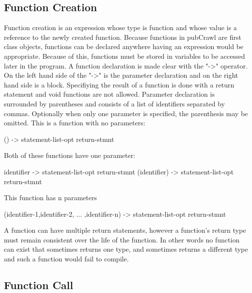 \documentclass[oneside]{book}
\begin{document}
\subsection{Function Creation}
Function creation is an expression whose type is function and whose value is a reference to the newly created function. Because functions in pubCrawl are first class objects, functions can be declared anywhere having an expression would be appropriate. Because of this, functions must be stored in variables to be accessed later in the program. A function declaration is made clear with the "-\textgreater" operator. On the left hand side of the "-\textgreater" is the parameter declaration and on the right hand side is a block. Specifiying the result of a function is done with a return statement and void functions are not allowed. Parameter declaration is surrounded by parentheses and consists of a list of identifiers separated by commas. Optionally when only one parameter is specified, the parenthesis may be omitted. 
This is a function with no parameters:
\begin{code}
() -> {
  statement-list-opt
  return-stmnt
}
\end{code}
Both of these functions have one parameter:
\begin{code}
identifier -> {
  statement-list-opt
  return-stmnt
}
(identifier) -> {
  statement-list-opt
  return-stmnt
}
\end{code}
This function has n parameters
\begin{code}
(identifier-1,identifier-2, ... ,identifier-n) -> {
  statement-list-opt
  return-stmnt
}
\end{code}
A function can have multiple return statements, however a function's return type must remain consistent over the life of the function. In other words no function can exist that sometimes returns one type, and sometimes returns a different type and such a function would fail to compile.

\subsection{Function Call}
\end{document}

